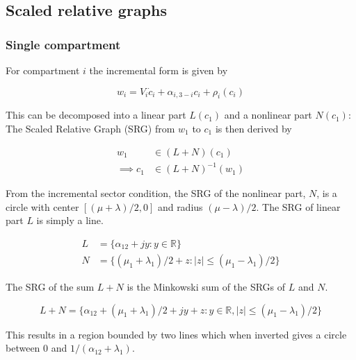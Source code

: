 \documentclass{article}
\begin{document}
\subsection{Scaled relative graphs}

\subsubsection{Single compartment}

For compartment $i$ the incremental form is given by

\begin{equation}
    w_i = V_i \dot{c}_i + \alpha_{i,3-i} c_i + \rho_i(c_i)
\end{equation}

This can be decomposed into a linear part $L(c_1)$ and a nonlinear part $N(c_1)$:
The Scaled Relative Graph (SRG) from $w_1$ to $c_1$ is then derived by

\begin{align}
    w_1 &\in (L + N)(c_1) \\
    \implies c_1 &\in (L + N)^{-1}(w_1) 
\end{align}

From the incremental sector condition, the SRG of the nonlinear part, $N$, is a circle with center $[(\mu+\lambda)/2, 0]$ and radius $(\mu-\lambda)/2$.
The SRG of linear part $L$ is simply a line.

\begin{align}
    L &= \{ \alpha_{12} + j y : y \in \mathbb{R} \} \\
    N &= \{ (\mu_1 + \lambda_1)/2 + z : |z| \leq (\mu_1 - \lambda_1)/2 \}
\end{align}

The SRG of the sum $L + N$ is the Minkowski sum of the SRGs of $L$ and $N$.

\begin{equation}
    L + N = \{ \alpha_{12} + (\mu_1 + \lambda_1)/2 + jy + z : y \in \mathbb{R}, |z| \leq (\mu_1 - \lambda_1)/2 \}
\end{equation}

This results in a region bounded by two lines which when inverted gives a circle between 0 and $1/(\alpha_{12} + \lambda_1)$.
\end{document}
